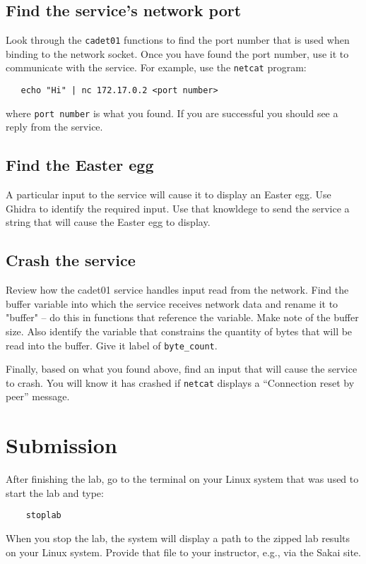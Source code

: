 \subsection{Find the service's network port}
Look through the {\tt cadet01} functions to find the port number that is used when binding to the network socket.
Once you have found the port number, use it to communicate with the service.  For example, use the {\tt netcat} program:
\begin{verbatim}
   echo "Hi" | nc 172.17.0.2 <port number>
\end{verbatim}
\noindent where {\tt port number} is what you found.  If you are successful you should see a reply from the service.

\subsection{Find the Easter egg}
A particular input to the service will cause it to display an Easter egg.  Use Ghidra to identify the required input.
Use that knowldege to send the service a string that will cause the Easter egg to display.

\subsection{Crash the service}
Review how the {cadet01} service handles input read from the network.  Find the buffer variable into which the service receives
network data and rename it to "buffer" -- do this in functions that reference the variable.  Make note of the buffer size.
Also identify the variable that 
constrains the quantity of bytes that will be read into the buffer.  Give it label of {\tt byte\_count}.

Finally, based on what you found above, find an input that will cause the service to crash.
You will know it has crashed if {\tt netcat} displays a ``Connection reset by peer'' message.

\section{Submission}
After finishing the lab, go to the terminal on your Linux system that was used to start the lab and type:
\begin{verbatim}
    stoplab 
\end{verbatim}
When you stop the lab, the system will display a path to the zipped lab results on your Linux system.  Provide that file to 
your instructor, e.g., via the Sakai site.

\copyrightnotice


